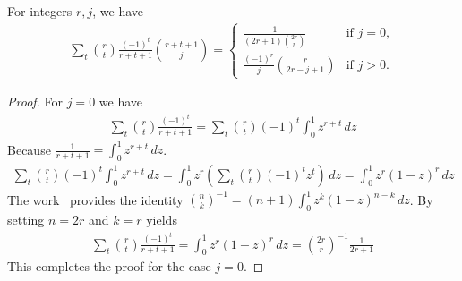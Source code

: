 \begin{lemma}
    \label{lem:altering-binomial-identity}
    For integers $r, j$, we have
    \begin{align*}
        \sum_{t} \binom{r}{t} \frac{(-1)^t}{r+t+1} \binom{r+t+1}{j}
        = \begin{cases}
              \displaystyle \frac{1}{(2r+1) \binom{2r}{r}} & \text{if } j=0, \\[0.8em]
              \displaystyle \frac{(-1)^r}{j} \binom{r}{2r-j+1} & \text{if } j>0.
        \end{cases}
    \end{align*}
    \begin{proof}
        For $j=0$ we have
        \begin{align*}
            \sum_t \binom{r}{t} \frac{(-1)^t}{r+t+1} = \sum_t \binom{r}{t} (-1)^t \int_0^1 z^{r+t} \, dz
        \end{align*}
        Because $\frac{1}{r+t+1} = \int_0^1 z^{r+t} \, dz$.
        \begin{align*}
            \sum_t \binom{r}{t} (-1)^t \int_0^1 z^{r+t} \, dz
            = \int_0^1 z^r \left( \sum_t \binom{r}{t} (-1)^t z^{t} \right) \, dz
            = \int_0^1 z^r (1 - z)^r \, dz
        \end{align*}
        The work~\cite{sury2004identities} provides the identity $\binom{n}{k}^{-1}=(n+1)\int_0^1 z^k(1-z)^{n-k}\,dz$.
        By setting $n=2r$ and $k=r$ yields
        \begin{align*}
            \sum_t \binom{r}{t} \frac{(-1)^t}{r+t+1} = \int_0^1 z^r (1-z)^{r}\,dz = \binom{2r}{r}^{-1} \frac{1}{2r+1}
        \end{align*}
        This completes the proof for the case $j=0$.


\end{proof}
\end{lemma}
